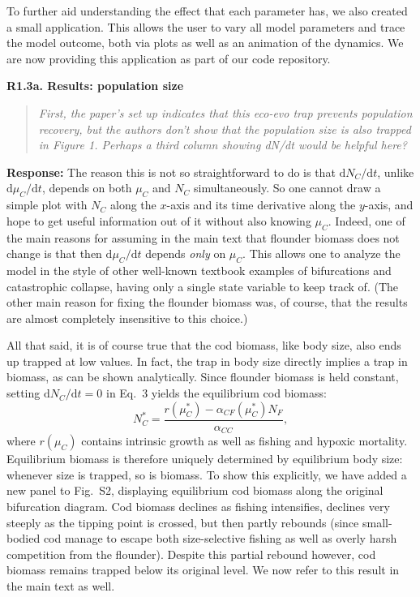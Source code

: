 \documentclass[11pt]{article}
\newenvironment{revcomment}[1]
  {\par\medskip\noindent\textbf{#1}\par\begin{quote}\itshape\color{commentgrey}}
  {\end{quote}}
\newcommand{\response}{\par\noindent\textbf{Response:} }
\begin{document}
To further aid understanding the effect that each parameter has, we also created a small application. This allows the user to vary all model parameters and trace the model outcome, both via plots as well as an animation of the dynamics. We are now providing this application as part of our code repository.

\begin{revcomment}{R1.3a. Results: population size}
First, the paper's set up indicates that this eco-evo trap prevents population recovery, but the authors don't show that the population size is also trapped in Figure 1. Perhaps a third column showing dN/dt would be helpful here?
\end{revcomment}

\response The reason this is not so straightforward to do is that $\mathrm{d}N_C/\mathrm{d}t$, unlike $\mathrm{d}\mu_C/\mathrm{d}t$, depends on both $\mu_C$ and $N_C$ simultaneously. So one cannot draw a simple plot with $N_C$ along the $x$-axis and its time derivative along the $y$-axis, and hope to get useful information out of it without also knowing $\mu_C$. Indeed, one of the main reasons for assuming in the main text that flounder biomass does not change is that then $\mathrm{d}\mu_C/\mathrm{d}t$ depends \textit{only} on $\mu_C$. This allows one to analyze the model in the style of other well-known textbook examples of bifurcations and catastrophic collapse, having only a single state variable to keep track of. (The other main reason for fixing the flounder biomass was, of course, that the results are almost completely insensitive to this choice.)

All that said, it is of course true that the cod biomass, like body size, also ends up trapped at low values. In fact, the trap in body size directly implies a trap in biomass, as can be shown analytically. Since flounder biomass is held constant, setting $\mathrm{d}N_C/\mathrm{d}t = 0$ in Eq.~3 yields the equilibrium cod biomass:
\[
  N_C^* = \frac{r(\mu_C^*) - \alpha_{CF}(\mu_C^*) N_F}{\alpha_{CC}},
\]
where $r(\mu_C)$ contains intrinsic growth as well as fishing and hypoxic mortality. Equilibrium biomass is therefore uniquely determined by equilibrium body size: whenever size is trapped, so is biomass. To show this explicitly, we have added a new panel to Fig.~S2, displaying equilibrium cod biomass along the original bifurcation diagram. Cod biomass declines as fishing intensifies, declines very steeply as the tipping point is crossed, but then partly rebounds (since small-bodied cod manage to escape both size-selective fishing as well as overly harsh competition from the flounder). Despite this partial rebound however, cod biomass remains trapped below its original level. We now refer to this result in the main text as well.
\end{document}

